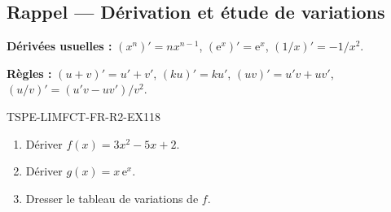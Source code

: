 

\subsection*{Rappel — Dérivation et étude de variations}

\textbf{Dérivées usuelles :} $(x^n)' = nx^{n-1}$, $(\mathrm{e}^x)' = \mathrm{e}^x$, $(1/x)' = -1/x^2$.

\textbf{Règles :} $(u+v)' = u'+v'$, $(ku)' = ku'$, $(uv)' = u'v + uv'$, $(u/v)' = (u'v-uv')/v^2$.

\begin{exercice}{TSPE-LIMFCT-FR-R2-EX1}{1}{8}
\begin{enumerate}
  \item Dériver $f(x) = 3x^2 - 5x + 2$.
  \item Dériver $g(x) = x\,\mathrm{e}^x$.
  \item Dresser le tableau de variations de $f$.
\end{enumerate}
\end{exercice}

